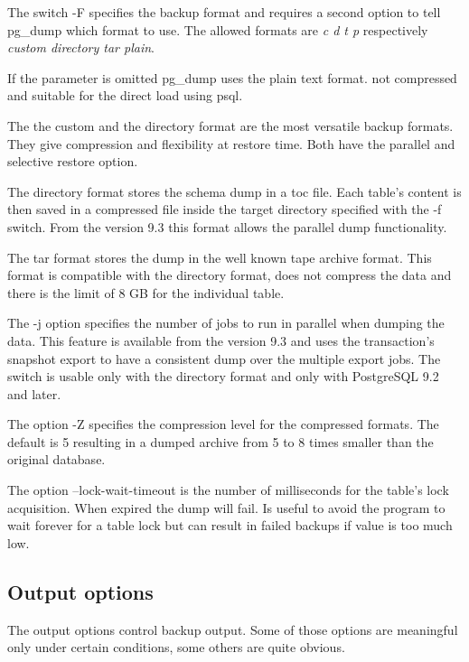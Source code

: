 The switch  -F specifies the backup format and requires a second
option to tell pg\_dump which format to use. The allowed formats are \textit{c d t p} respectively
\textit{custom directory tar plain}.\newline

If the parameter is omitted pg\_dump uses the plain text format. not compressed and suitable for the direct
load using psql. \newline

The the custom and the directory format are the most versatile backup formats. They give compression and
flexibility at restore time. Both have the parallel and selective restore option.\newline

The directory format stores the schema dump in a toc file. Each table's content is then saved in a
compressed file inside the target directory specified with the -f switch. From the version 9.3 this format
allows the parallel dump functionality. \newline

The tar format stores the dump in the well known tape archive format. This format is compatible
with the directory format, does not compress the data and there is the limit of 8 GB for the individual
table.\newline

The -j option specifies the number of jobs to run in parallel when dumping the data. This feature is
available from the version 9.3 and uses the transaction's snapshot export to have a consistent dump over
the multiple export jobs. The switch is usable only with the directory format and only with PostgreSQL 9.2
and later.\newline

The option -Z specifies the compression level for the compressed formats. The default is 5
resulting in a dumped archive from 5 to 8 times smaller than the original database.

The option --lock-wait-timeout is the number of milliseconds for the table's lock acquisition.
When expired the dump will fail. Is useful to avoid the program to wait forever for a table lock
but can result in failed backups if value is too much low.

\subsection{Output options}
\label{sub:PGDUMPOUTPUT}
The output options control backup output. Some of those options are meaningful only under certain
conditions, some others are quite obvious.\newline

